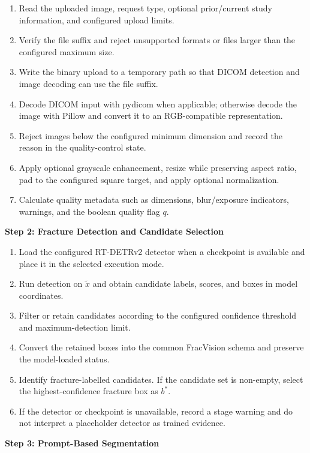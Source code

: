 \documentclass[12pt,a4paper]{article}
\begin{document}
\begin{enumerate}[leftmargin=30pt,label=1.\arabic*]
\item Read the uploaded image, request type, optional prior/current study information, and configured upload limits.
\item Verify the file suffix and reject unsupported formats or files larger than the configured maximum size.
\item Write the binary upload to a temporary path so that DICOM detection and image decoding can use the file suffix.
\item Decode DICOM input with pydicom when applicable; otherwise decode the image with Pillow and convert it to an RGB-compatible representation.
\item Reject images below the configured minimum dimension and record the reason in the quality-control state.
\item Apply optional grayscale enhancement, resize while preserving aspect ratio, pad to the configured square target, and apply optional normalization.
\item Calculate quality metadata such as dimensions, blur/exposure indicators, warnings, and the boolean quality flag $q$.
\end{enumerate}

\textbf{Step 2: Fracture Detection and Candidate Selection}

\begin{enumerate}[leftmargin=30pt,label=2.\arabic*]
\item Load the configured RT-DETRv2 detector when a checkpoint is available and place it in the selected execution mode.
\item Run detection on $\tilde{x}$ and obtain candidate labels, scores, and boxes in model coordinates.
\item Filter or retain candidates according to the configured confidence threshold and maximum-detection limit.
\item Convert the retained boxes into the common FracVision schema and preserve the model-loaded status.
\item Identify fracture-labelled candidates. If the candidate set is non-empty, select the highest-confidence fracture box as $b^*$.
\item If the detector or checkpoint is unavailable, record a stage warning and do not interpret a placeholder detector as trained evidence.
\end{enumerate}

\textbf{Step 3: Prompt-Based Segmentation}
\end{document}
